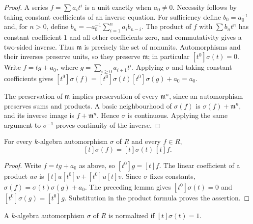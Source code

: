\begin{proof}
A series $f=\sum a_it^i$ is a unit exactly when $a_0\ne0$.
Necessity follows by taking constant coefficients of an inverse equation.
For sufficiency define $b_0=a_0^{-1}$ and, for $n>0$, define
$b_n=-a_0^{-1}\sum_{i=1}^n a_i b_{n-i}$. The product of $f$ with
$\sum b_nt^n$ has constant coefficient $1$ and all other coefficients
zero, and commutativity gives a two-sided inverse.
Thus $\mathfrak m$ is precisely the set of nonunits. Automorphisms and
their inverses preserve units, so they preserve $\mathfrak m$; in
particular $[t^0]\sigma(t)=0$.
Write $f=tg+a_0$, where $g=\sum_{i\ge0}a_{i+1}t^i$.
Applying $\sigma$ and taking constant coefficients gives
$[t^0]\sigma(f)=[t^0]\sigma(t)[t^0]\sigma(g)+a_0=a_0$.

The preservation of $\mathfrak m$ implies preservation of every
$\mathfrak m^n$, since an automorphism preserves sums and products.
A basic neighbourhood of $\sigma(f)$ is
$\sigma(f)+\mathfrak m^n$, and its inverse image is
$f+\mathfrak m^n$. Hence $\sigma$ is continuous. Applying the same
argument to $\sigma^{-1}$ proves continuity of the inverse.
\end{proof}

\begin{lemma}
\label{lem:power-series-aut-linear-coeff}
\leanok
For every $k$-algebra automorphism $\sigma$ of $R$ and every $f\in R$,
\[
 [t]\sigma(f)=[t]\sigma(t)\,[t]f.
\]
\end{lemma}

\begin{proof}
Write $f=tg+a_0$ as above, so $[t^0]g=[t]f$.
The linear coefficient of a product $uv$ is
$[t]u[t^0]v+[t^0]u[t]v$. Since $\sigma$ fixes constants,
$\sigma(f)=\sigma(t)\sigma(g)+a_0$. The preceding lemma gives
$[t^0]\sigma(t)=0$ and $[t^0]\sigma(g)=[t^0]g$.
Substitution in the product formula proves the assertion.
\end{proof}

\begin{definition}[Normalization]
\label{def:normalized-aut}
\leanok
A $k$-algebra automorphism $\sigma$ of $R$ is normalized if
$[t]\sigma(t)=1$.
\end{definition}

